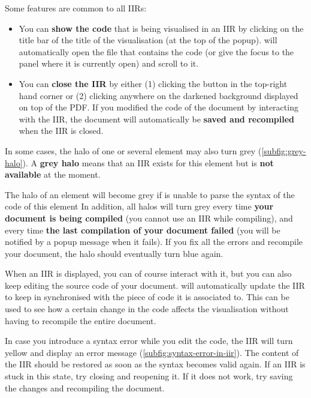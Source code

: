 Some features are common to all IIRs:
\begin{itemize}%
    \item You can \textbf{show the code} that is being visualised in an IIR by clicking on the title bar of the title of the visualisation (at the top of the popup). \iLaTeX{} will automatically open the file that contains the code (or give the focus to the panel where it is currently open) and scroll to it.
    \item You can \textbf{close the IIR} by either (1) clicking the button in the top-right hand corner or (2) clicking anywhere on the darkened background displayed on top of the PDF. If you modified the code of the document by interacting with the IIR, the document will automatically be \textbf{saved and recompiled} when the IIR is closed.
\end{itemize}

In some cases, the halo of one or several element may also turn grey (\autoref{subfig:grey-halo}).
A \textbf{grey halo} means that an IIR exists for this element but is \textbf{not available} at the moment.

The halo of an element will become grey if \iLaTeX{} is unable to parse the syntax of the code of this element
In addition, all halos will turn grey every time \textbf{your document is being compiled} (you cannot use an IIR while compiling), and every time \textbf{the last compilation of your document failed} (you will be notified by a popup message when it fails).
If you fix all the errors and recompile your document, the halo should eventually turn blue again.

\begin{info}
    When an IIR is displayed, you can of course interact with it, but you can also keep editing the source code of your document.
    \iLaTeX{} will automatically update the IIR to keep in synchronised with the piece of code it is associated to.
    This can be used to see how a certain change in the code affects the visualisation without having to recompile the entire document.
        
    In case you introduce a syntax error while you edit the code, the IIR will turn yellow and display an error message (\autoref{subfig:syntax-error-in-iir}).
    The content of the IIR should be restored as soon as the syntax becomes valid again.
    If an IIR is stuck in this state, try closing and reopening it.
    If it does not work, try saving the changes and recompiling the document.

\end{info}

